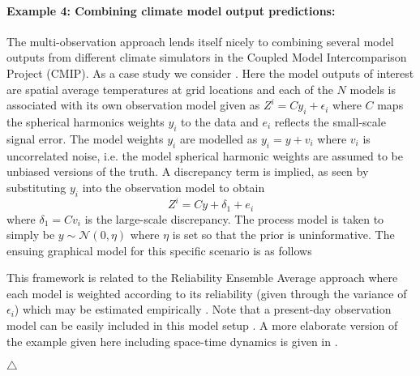 \documentclass[10pt,a4paper]{article}
\newcommand\xqed[1]{%
  \leavevmode\unskip\penalty9999 \hbox{}\nobreak\hfill
  \quad\hbox{#1}}
\newcommand\demo{\xqed{$\triangle$}}
\begin{document}
\paragraph{Example 4: Combining climate model output predictions:} The multi-observation approach lends itself nicely to combining several model outputs from different climate simulators in the Coupled Model Intercomparison Project (CMIP). As a case study we consider \cite{Furrer_2007}. Here the model outputs of interest are spatial average temperatures at grid locations and each of the $N$ models is associated with its own observation model given as $Z^i = Cy_i + \epsilon_i$ where $C$ maps the spherical harmonics weights $y_i$ to the data and $e_i$ reflects the small-scale signal error. The model weights $y_i$ are modelled as $y_i = y + v_i$ where $v_i$ is uncorrelated noise, i.e. the model spherical harmonic weights are assumed to be unbiased versions of the truth. A discrepancy term is implied, as seen by substituting $y_i$ into the observation model to obtain
\begin{equation}
Z^i = Cy + \delta_1 + e_i
\end{equation}
\noindent where $\delta_1 = Cv_i$ is the large-scale discrepancy. The process model is taken to simply be $y \sim \mathcal{N}(0,\eta)$ where $\eta$ is set so that the prior is uninformative. The ensuing graphical model for this specific scenario is as follows
\begin{figure}[h!]
\centering
{}
\end{figure}

\noindent This framework is related to the Reliability Ensemble Average approach where each model is weighted according to its reliability (given through the variance of $\epsilon_i$) which may be estimated empirically \citep{Giorgi_2002}. Note that a present-day observation model can be easily included in this model setup \citep[see also][]{Smith_2009,Tebaldi_2007}. A more elaborate version of the example given here including space-time dynamics is given in \cite{Berliner_2008}.

\demo
\end{document}

